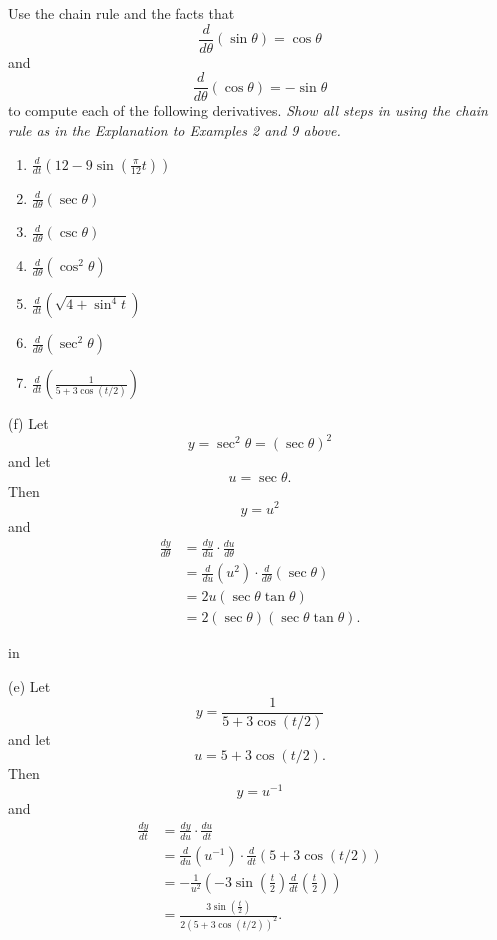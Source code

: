 \documentclass{ximera}
\newcommand{\pskip}{\vskip 0.1 in}
\begin{document}
\begin{exercise}  \label{ExLdfsdfll}
Use the chain rule and the facts that 
\[
\frac{d}{d\theta} \left( \sin\theta \right) = \cos\theta
\]
and
\[
\frac{d}{d\theta} \left( \cos\theta \right) = -\sin\theta
\]
to compute each of the following derivatives. \emph{Show all steps in using the chain rule as in the Explanation to Examples 2 and 9 above.}

\begin{enumerate}

\item $\frac{d}{dt} \left( 12 - 9\sin\left( \frac{\pi}{12}t \right) \right)$

\item $\frac{d}{d\theta} \left( \sec\theta \right)$

\item $\frac{d}{d\theta} \left( \csc\theta \right)$

\item $\frac{d}{d\theta}\left( \cos^2\theta \right)$

\item $\frac{d}{dt} \left( \sqrt{4 + \sin^4 t} \right)$  

\item  $\frac{d}{d\theta} \left( \sec^2\theta \right)$

\item $\frac{d}{dt} \left( \frac{1}{5+3\cos (t/2)}   \right)$

\end{enumerate}

\begin{explanation}
(f) Let 
\[
   y = \sec^2\theta = (\sec\theta)^2 
\]
and let 
\[
    u = \sec\theta .
\]
Then 
\[
  y  =u^2
\]
and
\begin{align*}
   \frac{dy}{d\theta}   &= \frac{dy}{du} \cdot \frac{du}{d\theta} \\
                                &= \frac{d}{du}\left( u^2 \right) \cdot \frac{d}{d\theta} \left( \sec\theta \right) \\
                                &= 2u ( \sec\theta \tan\theta) \\
                                &= 2 (\sec\theta) ( \sec\theta \tan\theta) .
\end{align*}

\pskip

(e) Let 
\[
   y = \frac{1}{5+3\cos(t/2)}%
\]
and let 
\[
    u = 5+3\cos(t/2) .
\]
Then 
\[
  y  =u^{-1}
\]
and
\begin{align*}
   \frac{dy}{dt}   &= \frac{dy}{du} \cdot \frac{du}{dt} \\
                                &= \frac{d}{du}\left( u^{-1} \right) \cdot \frac{d}{dt} \left( 5+3\cos(t/2) \right) \\
                                &= -\frac{1}{u^2} \left( -3 \sin \left(\frac{t}{2}\right) \frac{d}{dt}\left( \frac{t}{2}\right)\right) \\
                                &= \frac{3\sin \left(\frac{t}{2}\right)}{2(5+3\cos(t/2))^2} .
\end{align*}
\end{explanation}

\end{exercise}
\end{document}

